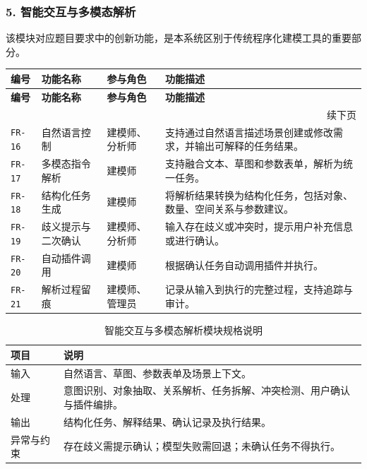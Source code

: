 \documentclass[UTF8,a4paper,10pt]{ctexart}
\begin{document}
\subsubsection*{5. 智能交互与多模态解析}
该模块对应题目要求中的创新功能，是本系统区别于传统程序化建模工具的重要部分。

{
\renewcommand{\arraystretch}{1.35}

\begin{longtable}{p{1.8cm} p{2.6cm} p{2.2cm} p{6.2cm}}
\toprule
\rowcolor{gray!20}
\textbf{编号} & \textbf{功能名称} & \textbf{参与角色} & \textbf{功能描述} \\
\midrule
\endfirsthead

\toprule
\rowcolor{gray!20}
\textbf{编号} & \textbf{功能名称} & \textbf{参与角色} & \textbf{功能描述} \\
\midrule
\endhead

\midrule
\multicolumn{4}{r}{\small 续下页}\\
\endfoot

\bottomrule
\endlastfoot

\texttt{FR-16} & 自然语言控制 & 建模师、分析师 & 支持通过自然语言描述场景创建或修改需求，并输出可解释的任务结果。 \\
\texttt{FR-17} & 多模态指令解析 & 建模师 & 支持融合文本、草图和参数表单，解析为统一任务。 \\
\texttt{FR-18} & 结构化任务生成 & 建模师 & 将解析结果转换为结构化任务，包括对象、数量、空间关系与参数建议。 \\
\texttt{FR-19} & 歧义提示与二次确认 & 建模师、分析师 & 输入存在歧义或冲突时，提示用户补充信息或进行确认。 \\
\texttt{FR-20} & 自动插件调用 & 建模师 & 根据确认任务自动调用插件并执行。 \\
\texttt{FR-21} & 解析过程留痕 & 建模师、管理员 & 记录从输入到执行的完整过程，支持追踪与审计。 \\

\end{longtable}
}

{
\renewcommand{\arraystretch}{1.3}

\begin{table}[H]
\centering
\caption{智能交互与多模态解析模块规格说明}

\begin{tabularx}{\textwidth}{p{2.6cm} Y}
\toprule
{}
\textbf{项目} & \textbf{说明} \\
\midrule

输入 & 自然语言、草图、参数表单及场景上下文。 \\
处理 & 意图识别、对象抽取、关系解析、任务拆解、冲突检测、用户确认与插件编排。 \\
输出 & 结构化任务、解释结果、确认记录及执行结果。 \\
异常与约束 & 存在歧义需提示确认；模型失败需回退；未确认任务不得执行。 \\

\bottomrule
\end{tabularx}
\end{table}
}
\end{document}
